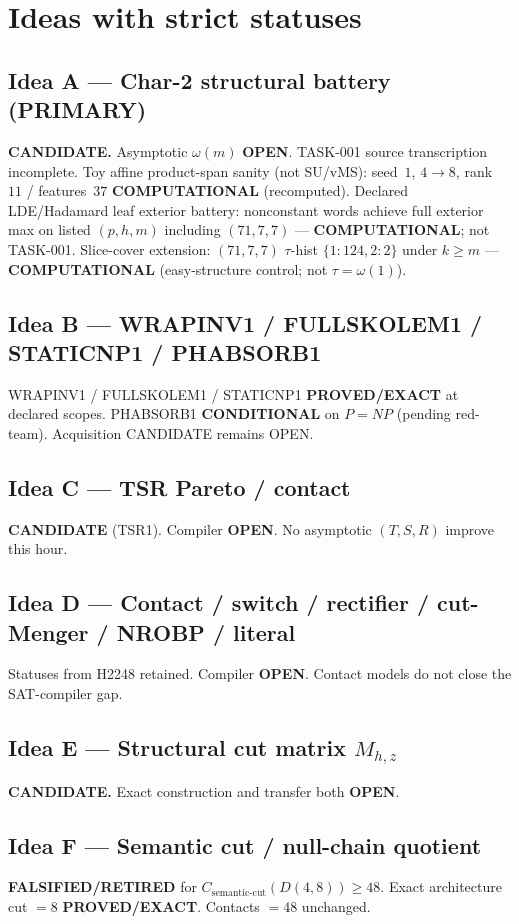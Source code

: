 \documentclass[11pt]{article}
\begin{document}
\section*{Ideas with strict statuses}
\subsection*{Idea A --- Char-2 structural battery (PRIMARY)}
\textbf{CANDIDATE.} Asymptotic $\omega(m)$ \textbf{OPEN}. TASK-001 source transcription incomplete.
Toy affine product-span sanity (not SU/vMS): seed~$1$, $4\to8$, rank~$11$ / features~$37$
\textbf{COMPUTATIONAL} (recomputed).
Declared LDE/Hadamard leaf exterior battery: nonconstant words achieve full exterior max on
listed $(p,h,m)$ including $(71,7,7)$ --- \textbf{COMPUTATIONAL}; not TASK-001.
Slice-cover extension: $(71,7,7)$ $\tau$-hist $\{1{:}124,2{:}2\}$ under $k{\ge}m$ ---
\textbf{COMPUTATIONAL} (easy-structure control; not $\tau=\omega(1)$).

\subsection*{Idea B --- WRAPINV1 / FULLSKOLEM1 / STATICNP1 / PHABSORB1}
WRAPINV1 / FULLSKOLEM1 / STATICNP1 \textbf{PROVED/EXACT} at declared scopes.
PHABSORB1 \textbf{CONDITIONAL} on $P=NP$ (pending red-team). Acquisition CANDIDATE remains OPEN.

\subsection*{Idea C --- TSR Pareto / contact}
\textbf{CANDIDATE} (TSR1). Compiler \textbf{OPEN}. No asymptotic $(T,S,R)$ improve this hour.

\subsection*{Idea D --- Contact / switch / rectifier / cut-Menger / NROBP / literal}
Statuses from H2248 retained. Compiler \textbf{OPEN}. Contact models do not close the SAT-compiler gap.

\subsection*{Idea E --- Structural cut matrix $M_{h,z}$}
\textbf{CANDIDATE.} Exact construction and transfer both \textbf{OPEN}.

\subsection*{Idea F --- Semantic cut / null-chain quotient}
\textbf{FALSIFIED/RETIRED} for $C_{\mathrm{semantic\textrm{-}cut}}(D(4,8))\ge48$.
Exact architecture cut $=8$ \textbf{PROVED/EXACT}. Contacts $=48$ unchanged.
\end{document}
